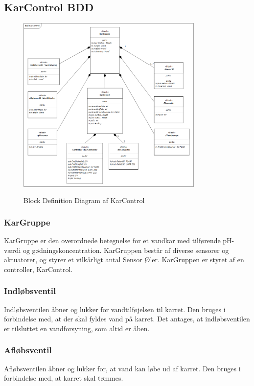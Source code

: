 
\subsection{KarControl BDD}

\begin{figure}[H]
	\centering
	\includegraphics[width=0.82\textwidth]{Systemarkitektur/KarControl/KarControl_BDD.png}
	\label{fig:KarControl BDD}
	\caption{Block Definition Diagram af KarControl}
\end{figure}

\subsubsection{KarGruppe}
KarGruppe er den overordnede betegnelse for et vandkar med tilførende pH-værdi og gødningskoncentration. KarGruppen består af diverse sensorer og aktuatorer, og styrer et vilkårligt antal Sensor Ø’er. KarGruppen er styret af en controller, KarControl.

\subsubsection{Indløbsventil}
Indløbsventilen åbner og lukker for vandtilføjelsen til karret. Den bruges i forbindelse med, at der skal fyldes vand på karret. Det antages, at indløbsventilen er tilsluttet en vandforsyning, som altid er åben.

\subsubsection{Afløbsventil}
Afløbsventilen åbner og lukker for, at vand kan løbe ud af karret. Den bruges i forbindelse med, at karret skal tømmes.

